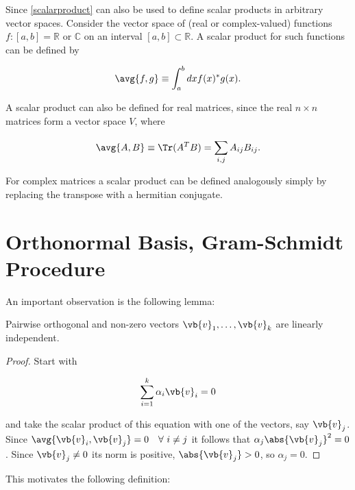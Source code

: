 \documentclass[a4paper,12pt]{report}
\begin{document}
Since \cref{scalarproduct} can also be used to define scalar products in arbitrary vector spaces. Consider the vector space of (real or complex-valued) functions \(f: [a,b] = \mathbb{R}\text { or } \mathbb{C}\) on an interval \([a,b] \subset \mathbb{R}\). A scalar product for such functions can be defined by 

\begin{equation}
    \avg{f,g} \equiv \int_{a}^{b} dx f(x)^{*} g(x).   
\end{equation}

A scalar product can also be defined for real matrices, since the real \(n \times n\) matrices form a vector space \(V\), where

\begin{equation} \label{matricesscalarproduct} 
    \avg{A, B} \equiv \Tr (A^{T}B ) = \sum_{i,j}^{} A_{ij} B_{ij}. 
\end{equation}

For complex matrices a scalar product can be defined analogously simply by replacing the transpose with a hermitian conjugate.

\section{Orthonormal Basis, Gram-Schmidt Procedure}

An important observation is the following lemma:

\begin{lemma}
Pairwise orthogonal and non-zero vectors \(\vb{v} _{1}, \hdots , \vb{v} _{k}  \) are linearly independent.  
\end{lemma}

\begin{proof}
Start with 

\begin{equation}
    \sum_{i=1}^{k} \alpha _{i}\vb{v} _{i} = 0 
\end{equation}

and take the scalar product of this equation with one of the vectors, say \(\vb{v} _{j} \). Since \(\avg{\vb{v} _{i} , \vb{v} _{j} } = 0 ~~~\forall ~ i \neq j\) it follows that \(\alpha _{j}\abs{\vb{v} _{j} }^2 = 0  \). Since \(\vb{v} _{j} \neq 0 \) its norm is positive, \(\abs{\vb{v} _{j} } > 0 \), so \(\alpha _{j} = 0 \).       

\end{proof}

This motivates the following definition:
\end{document}
